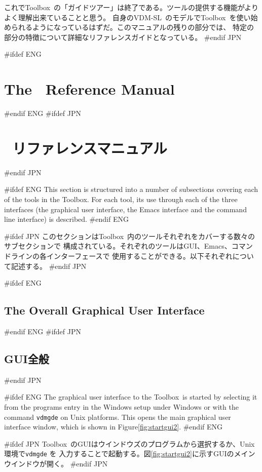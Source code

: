 \documentclass[\pformat,12pt]{article}
\newcommand{\vdmslpp}{VDM-SL}
\newcommand{\Toolbox}{Toolbox}
\newcommand{\vdmgde}{vdmgde}
\newcommand{\vdmslpp}{VDM++}
\newcommand{\Toolbox}{Toolbox}
\newcommand{\vdmgde}{vppgde}
\begin{document}
これで\Toolbox\ の「ガイドツアー」は終了である。ツールの提供する機能がよりよく理解出来ていることと思う。
自身の\vdmslpp\ のモデルで\Toolbox\ を使い始められるようになっているはずだ。このマニュアルの残りの部分では、
特定の部分の特徴について詳細なリファレンスガイドとなっている。
#endif JPN

\newpage
#ifdef ENG
\section{The \protect\VDMTools\ Reference Manual}\label{sec:ref}
#endif ENG
#ifdef JPN
\section{\protect\VDMTools\ リファレンスマニュアル}\label{sec:ref}
#endif JPN

#ifdef ENG
This section is structured into a number of subsections covering each
of the tools in the \Toolbox. For each tool, its use through each of
the three interfaces (the graphical user interface, the Emacs
interface and the command line interface) is described.
#endif ENG

#ifdef JPN
このセクションは\Toolbox\ 内のツールそれぞれをカバーする数々のサブセクションで
構成されている。それぞれのツールはGUI、Emacs、コマンドラインの各インターフェースで
使用することができる。以下それぞれについて記述する。
#endif JPN

#ifdef ENG
\subsection{The Overall Graphical User Interface}\label{sec:GUI}
#endif ENG
#ifdef JPN
\subsection{GUI全般}\label{sec:GUI}
#endif JPN

#ifdef ENG
The graphical user interface to the \Toolbox\ is started by selecting
it from the programs entry in the Windows setup under Windows or with
the command {\tt \vdmgde} on Unix platforms.
This opens the main graphical user interface window, which is shown in 
Figure\ref{fig:startgui2}. 
#endif ENG

#ifdef JPN
\Toolbox\ のGUIはウインドウズのプログラムから選択するか、Unix環境で{\tt \vdmgde} を
入力することで起動する。図\ref{fig:startgui2}に示すGUIのメインウインドウが開く。
#endif JPN
\end{document}
